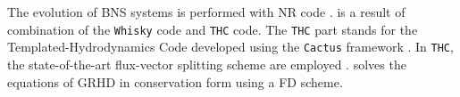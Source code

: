 
The evolution of \ac{BNS} systems is performed with \wisky{} \ac{NR} code
 \citep{Radice:2013apa,Radice:2012cu,Radice:2013xpa,Radice:2013hxh,
    Radice:2015nva,Radice:2016dwd,Radice:2018pdn,Radice:2020ids}.
\wisky{} is a result of combination of the \texttt{Whisky} code \citep{Baiotti:2004wn} and \texttt{THC} code.
The \texttt{THC} part stands for the Templated-Hydrodynamics Code developed using the \texttt{Cactus} framework 
\citep{Goodale:2003}. 
In \texttt{THC}, the state-of-the-art flux-vector splitting scheme are employed . 
%
%
%
\wisky{} solves the equations of \ac{GRHD} in conservation form using a \ac{FD} scheme. 

